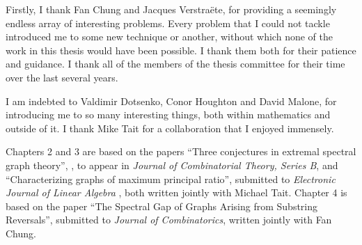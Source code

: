 \begin{frontmatter}
%
\tableofcontents
\listoffigures  %



%
%
\begin{acknowledgements}

Firstly, I thank Fan Chung and Jacques Verstra\"{e}te, for providing a seemingly endless
array of interesting problems.  Every problem that I could not tackle introduced me
to some new technique or another, without which none of the work in this thesis would have
been possible.  I thank them both for their patience and guidance.  I thank all
of the members of the thesis committee for their time over the last several years.


I am indebted to Valdimir Dotsenko, Conor Houghton and David Malone, for introducing me
to so many interesting things, both within mathematics and outside of it.
I thank Mike Tait for a collaboration
that I enjoyed immensely. 




Chapters 2 and 3 are based on the papers ``Three conjectures in extremal spectral graph theory'',
 \cite{TaitTobin2017}, to appear in \textit{Journal of Combinatorial Theory, Series B},
 and ``Characterizing graphs of maximum principal ratio'', submitted to
 \textit{Electronic Journal of Linear Algebra} \cite{TaitTobin2015},
 both written jointly with Michael Tait.
Chapter 4 is based on the paper ``The Spectral Gap of Graphs Arising from Substring Reversals'',
submitted to \textit{Journal of Combinatorics}, written jointly with Fan Chung.

\end{acknowledgements}



\end{frontmatter}
